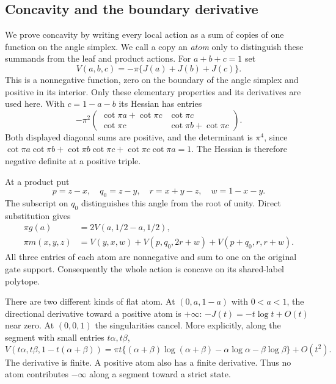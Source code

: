 \subsection{Concavity and the boundary derivative}
We prove concavity by writing every local action as a sum of copies of
one function on the angle simplex. We call a copy an \emph{atom}
only to distinguish these summands from the leaf and product actions.
For $a+b+c=1$ set
\[
 V(a,b,c)=-\pi\{J(a)+J(b)+J(c)\}.
\]
This is a nonnegative function, zero on the boundary of
the angle simplex and positive in its interior.
Only these elementary properties and its derivatives
are used here. With $c=1-a-b$ its Hessian has entries
\[
 -\pi^2
 \begin{pmatrix}
  \cot\pi a+\cot\pi c&\cot\pi c\\
  \cot\pi c&\cot\pi b+\cot\pi c
 \end{pmatrix}.
\]
Both displayed diagonal sums are positive, and the
determinant is $\pi^4$, since
$\cot\pi a\cot\pi b+\cot\pi b\cot\pi c+
\cot\pi c\cot\pi a=1$. The Hessian is therefore negative
definite at a positive triple.

At a product put
\[
 p=z-x,\quad q_0=z-y,\quad r=x+y-z,\quad w=1-x-y.
\]
The subscript on $q_0$ distinguishes this angle from
the root of unity. Direct substitution gives
\begin{align}
 \pi g(a)&=2V(a,1/2-a,1/2),\label{st:leaf-atoms}\\
 \pi m(x,y,z)&=
 V(y,x,w)+V(p,q_0,2r+w)+V(p+q_0,r,r+w).
 \label{st:gate-atoms}
\end{align}
All three entries of each atom are nonnegative and sum
to one on the original gate support. Consequently the
whole action is concave on its shared-label polytope.

There are two different kinds of flat atom. At
$(0,a,1-a)$ with $0<a<1$, the directional derivative
toward a positive atom is $+\infty$:
$-J(t)=-t\log t+O(t)$ near zero.
At $(0,0,1)$ the singularities cancel. More explicitly,
along the segment with small entries $t\alpha,t\beta$,
\[
 V(t\alpha,t\beta,1-t(\alpha+\beta))
 =\pi t\{(\alpha+\beta)\log(\alpha+\beta)
                  -\alpha\log\alpha-\beta\log\beta\}
       +O(t^2).
\]
The derivative is finite. A positive atom also has a
finite derivative. Thus no atom contributes $-\infty$
along a segment toward a strict state.

